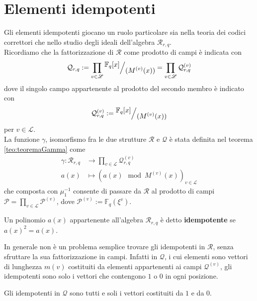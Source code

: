 \section{Elementi idempotenti}

Gli elementi idempotenti giocano un ruolo particolare sia nella teoria dei codici correttori che nello studio degli ideali dell'algebra $\mathcal{R}_{r,q}$. \\
Ricordiamo che la fattorizzazione di $\mathcal{R}$ come prodotto di campi è indicata con
\begin{align*}
    \mathcal{Q}_{r,q}
    :=
    \prod_{v\in \mathscr{L}} \quotient{\mathbb{F}_{q} \lbrack x \rbrack  }{(M^{(v)}(x))}
    =
    \prod_{v\in \mathscr{L}} \mathcal{Q}_{r,q}^{(v)}
\end{align*}
dove il singolo campo appartenente al prodotto del secondo membro è indicato con 
\begin{align*}
    \mathcal{Q}_{r,q}^{(v)}
    :=
    \quotient{\mathbb{F}_{q} \lbrack x \rbrack  }{(M^{(v)}(x))}
\end{align*}
per $v\in \mathscr{L}$.\\
La funzione $\gamma$, isomorfismo fra le due strutture $\mathcal{R}$ e $\mathcal{Q}$ è stata definita nel teorema \ref{teo:teoremaGamma} come
\begin{align*}
\gamma :  \mathcal{R}_{r,q}  & \longrightarrow  \prod_{v\in \mathscr{L}} \mathcal{Q}_{r,q}^{(v)}   \\
                        a(x) &\longmapsto (a(x)\mod{M^{(v)}(x)})_{v\in \mathscr{L}}
\end{align*}
che composta con $\mu_{1}^{-1}$ consente di passare da $\mathcal{R}$ al prodotto di campi $\mathcal{P} = \prod_{v\in \mathscr{L}} \mathcal{P}^{(v)}$, dove $\mathcal{P}^{(v)} := \mathbb{F}_{q}(\xi^{v})$.
\begin{definizione}
   Un polinomio $a(x)$ appartenente all'algebra $\mathcal{R}_{r,q}$ è detto {\bf idempotente} se $a(x)^2 = a(x)$.
\end{definizione}
\noindent
In generale non è un problema semplice trovare gli idempotenti in $\mathcal{R}$, senza sfruttare la sua fattorizzazione in campi. Infatti in $\mathcal{Q}$, i cui elementi sono vettori di lunghezza $m(v)$ costituiti da elementi appartenenti ai campi $\mathcal{Q}^{(v)}$, gli idempotenti sono solo i vettori che contengono $1$ o $0$ in ogni posizione. 
\begin{prop}
   Gli idempotenti in $\mathcal{Q}$ sono tutti e soli i vettori costituiti da $1$ e da $0$.
\end{prop}
